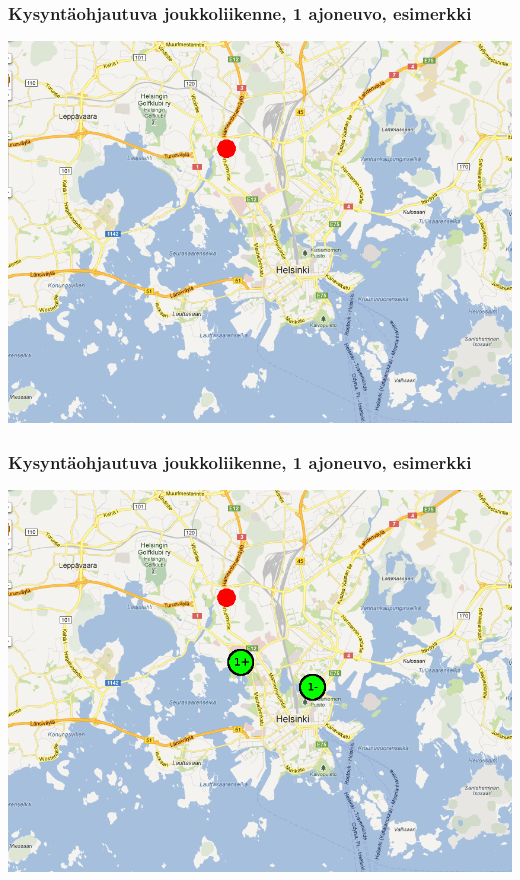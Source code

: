 \documentclass{beamer}
\begin{document}
        \begin{frame}
  \frametitle{Kysyntäohjautuva joukkoliikenne, 1 ajoneuvo, esimerkki }   %
\begin{center}
\includegraphics[scale=0.3]{ekademo01}
\end{center}
\end{frame}

        \begin{frame}
  \frametitle{Kysyntäohjautuva joukkoliikenne, 1 ajoneuvo, esimerkki}   %
\begin{center}
\includegraphics[scale=0.3]{ekademo02}
\end{center}
    \end{frame}
    
\end{document}
